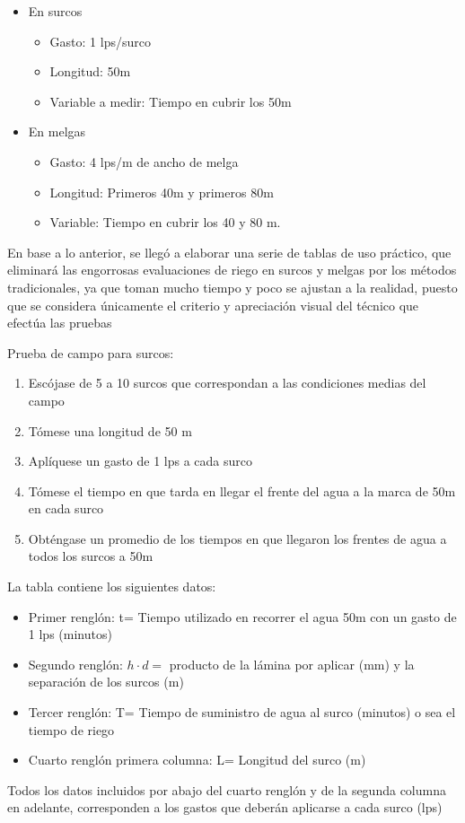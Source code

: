 \begin{itemize}
    \item En surcos \begin{itemize}
        \item Gasto: 1 lps/surco
        \item Longitud: 50m
        \item Variable a medir: Tiempo en cubrir los 50m 
    \end{itemize}
    \item En melgas \begin{itemize}
        \item Gasto: 4 lps/m de ancho de melga
        \item Longitud: Primeros 40m y primeros 80m
        \item Variable: Tiempo en cubrir los 40 y 80 m.
    \end{itemize}
\end{itemize}
En base a lo anterior, se llegó a elaborar una serie de tablas de uso práctico, que eliminará las engorrosas evaluaciones de riego en surcos y melgas por los métodos tradicionales, ya que toman mucho tiempo y poco se ajustan a la realidad, puesto que se considera únicamente el criterio y apreciación visual del técnico que efectúa las pruebas

Prueba de campo para surcos:
\begin{enumerate}
    \item Escójase de 5 a 10 surcos que correspondan a las condiciones medias del campo
    \item Tómese una longitud de 50 m
    \item Aplíquese un gasto de 1 lps a cada surco
    \item Tómese el tiempo en que tarda en llegar el frente del agua  a la marca de 50m en cada surco
    \item Obténgase un promedio de los tiempos en que llegaron los frentes de agua a todos los surcos a 50m
\end{enumerate}

La tabla contiene los siguientes datos:
\begin{itemize}
    \item Primer renglón: t= Tiempo utilizado en recorrer el agua 50m con un gasto de 1 lps (minutos)
    \item Segundo renglón: $h\cdot d=$ producto de la lámina por aplicar (mm) y la separación de los surcos (m)
    \item Tercer renglón: T= Tiempo de suministro de agua al surco (minutos) o sea el tiempo de riego
    \item Cuarto renglón primera columna: L= Longitud del surco (m)
\end{itemize}
Todos los datos incluidos por abajo del cuarto renglón y de la segunda columna en adelante, corresponden a los gastos que deberán aplicarse a cada surco (lps)

